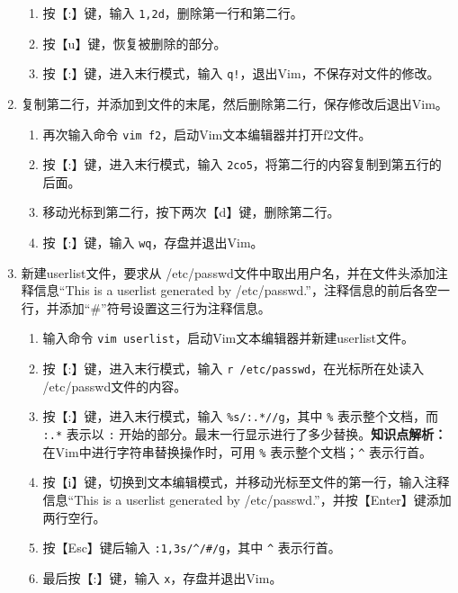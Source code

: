 \begin{enumerate}
\begin{enumerate}
      \item 按【:】键，输入 \verb|1,2d|，删除第一行和第二行。
      \item 按【u】键，恢复被删除的部分。
      \item 按【:】键，进入末行模式，输入 \verb|q!|，退出Vim，不保存对文件的修改。
    \end{enumerate}
  \item 复制第二行，并添加到文件的末尾，然后删除第二行，保存修改后退出Vim。
    \begin{enumerate}
      \item 再次输入命令 \verb|vim f2|，启动Vim文本编辑器并打开f2文件。
      \item 按【:】键，进入末行模式，输入 \verb|2co5|，将第二行的内容复制到第五行的后面。
      \item 移动光标到第二行，按下两次【d】键，删除第二行。
      \item 按【:】键，输入 \verb|wq|，存盘并退出Vim。
    \end{enumerate}
  \item 新建userlist文件，要求从 /etc/passwd文件中取出用户名，并在文件头添加注释信息“This is a userlist generated by /etc/passwd.”，注释信息的前后各空一行，并添加“\#”符号设置这三行为注释信息。
    \begin{enumerate}
      \item 输入命令 \verb|vim userlist|，启动Vim文本编辑器并新建userlist文件。
      \item 按【:】键，进入末行模式，输入 \verb|r /etc/passwd|，在光标所在处读入 /etc/passwd文件的内容。
      \item 按【:】键，进入末行模式，输入 \verb|%s/:.*//g|，其中 \verb|%| 表示整个文档，而 \verb|:.*| 表示以 \verb|:| 开始的部分。最末一行显示进行了多少替换。\textbf{知识点解析：}在Vim中进行字符串替换操作时，可用 \verb|%| 表示整个文档；\verb|^| 表示行首。
      \item 按【i】键，切换到文本编辑模式，并移动光标至文件的第一行，输入注释信息“This is a userlist generated by /etc/passwd.”，并按【Enter】键添加两行空行。
      \item 按【Esc】键后输入 \verb|:1,3s/^/#/g|，其中 \verb|^| 表示行首。
      \item 最后按【:】键，输入 \verb|x|，存盘并退出Vim。
    \end{enumerate}
\end{enumerate}

